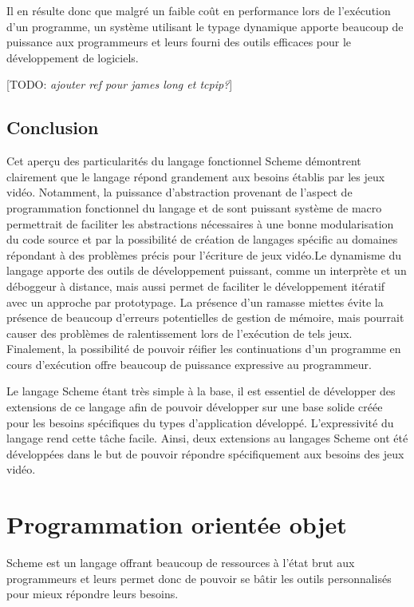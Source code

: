 \documentclass[12pt,oneside,letterpaper,francais]{book}
\newcommand{\todo}[1]{[TODO: {\it #1}]}
\begin{document}
Il en résulte donc que malgré un faible coût en performance lors de
l'exécution d'un programme, un système utilisant le typage dynamique
apporte beaucoup de puissance aux programmeurs et leurs fourni des
outils efficaces pour le développement de logiciels.

\todo{ajouter ref pour james long et tcpip?}


\section{Conclusion}

Cet aperçu des particularités du langage fonctionnel Scheme démontrent
clairement que le langage répond grandement aux besoins établis par
les jeux vidéo. Notamment, la puissance d'abstraction provenant de
l'aspect de programmation fonctionnel du langage et de sont puissant
système de macro permettrait de faciliter les abstractions nécessaires
à une bonne modularisation du code source et par la possibilité de
création de langages spécific au domaines répondant à des problèmes
précis pour l'écriture de jeux vidéo.Le dynamisme du langage apporte
des outils de développement puissant, comme un interprète et un
déboggeur à distance, mais aussi permet de faciliter le développement
itératif avec un approche par prototypage. La présence d'un ramasse
miettes évite la présence de beaucoup d'erreurs potentielles de
gestion de mémoire, mais pourrait causer des problèmes de
ralentissement lors de l'exécution de tels jeux. Finalement, la
possibilité de pouvoir réifier les continuations d'un programme en
cours d'exécution offre beaucoup de puissance expressive au
programmeur.

Le langage Scheme étant très simple à la base, il est essentiel de
développer des extensions de ce langage afin de pouvoir développer sur
une base solide créée pour les besoins spécifiques du types
d'application développé. L'expressivité du langage rend cette tâche
facile. Ainsi, deux extensions au langages Scheme ont été développées
dans le but de pouvoir répondre spécifiquement aux besoins des jeux
vidéo.


\chapter{Programmation orientée objet}



Scheme est un langage offrant beaucoup de ressources à l'état brut aux
programmeurs et leurs permet donc de pouvoir se bâtir les outils
personnalisés pour mieux répondre leurs besoins. 
\end{document}
